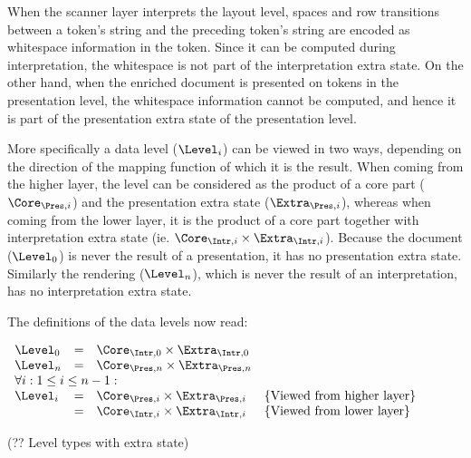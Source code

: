\bc
When the scanner layer interprets the layout level, spaces and row transitions between a token's string and the preceding token's string are encoded as whitespace information in the token. Since it can be computed during interpretation, the whitespace is not part of the interpretation extra state. On the other hand, when the enriched document is presented on tokens in the presentation level, the whitespace information cannot be computed, and hence it is part of the presentation extra state of the presentation level.
\ec


More specifically a data level ($\Level_{i}$) can be viewed in two ways, depending on the direction of the mapping function of which it is the result. When coming from the higher layer, the level can be considered as the product of a core part ($\Core_{\Pres,i}$) and the presentation extra state ($\Extra_{\Pres,i}$), whereas when coming from the lower layer, it is the product of a core part together with interpretation extra state (ie. $\Core_{\Intr,i} \times \Extra_{\Intr,i}$). Because the document ($\Level_0$) is never the result of a presentation, it has no presentation extra state. Similarly the rendering ($\Level_n$), which is never the result of an interpretation, has no interpretation extra state.

The definitions of the data levels now read:

\begin{small}\(\begin{array}{lcll}
\Level_{0} & = & \Core_{\Intr,0} \times \Extra_{\Intr,0}\\
\Level_{n} & = & \Core_{\Pres,n} \times \Extra_{\Pres,n}\\
\lefteqn{\forall i:1 \le i \le n-1:}  \\
\Level_{i}  & = & \Core_{\Pres,i} \times \Extra_{\Pres,i}     & \text{\{Viewed from higher layer\}}\\
                & = & \Core_{\Intr,i} \times \Extra_{\Intr,i} &  \text{\{Viewed from lower layer\}}\\
\end{array}\)\end{small}
\begin{center}(?? Level types with extra state)\end{center}\vspace{1em}

